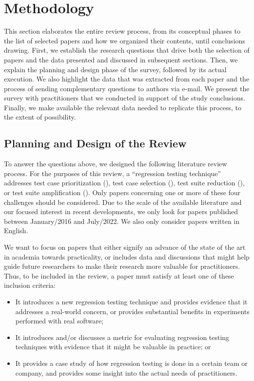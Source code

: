 \section{Methodology}\label{sec:lit_methodology}

This section elaborates the entire review process, from its conceptual phases to the list of selected papers and how we organized their contents, until conclusions drawing.
First, we establish the research questions that drive both the selection of papers and the data presented and discussed in subsequent sections.
Then, we explain the planning and design phase of the survey, followed by its actual execution.
We also highlight the data that was extracted from each paper and the process of sending complementary questions to authors via e-mail. We present the survey with practitioners that we conducted in support of the study conclusions.
Finally, we make available the relevant data needed to replicate this process, to the extent of possibility.

\subsection{Planning and Design of the Review}

To answer the questions above, we designed the following literature review process.
For the purposes of this review, a ``regression testing technique'' addresses test case prioritization (\tcp), test case selection (\tcs), test suite reduction (\tsr), or test suite amplification (\tsa).
Only papers concerning one or more of these four challenges should be considered.
Due to the scale of the available literature and our focused interest in recent developments, we only look for papers published between January/2016 and July/2022.
We also only consider papers written in English.

We want to focus on papers that either signify an advance of the state of the art in academia towards practicality, or includes data and discussions that might help guide future researchers to make their research more valuable for practitioners.
Thus, to be included in the review, a paper must satisfy at least one of these inclusion criteria:
\begin{itemize}
    \item It introduces a new regression testing technique and provides evidence that it addresses a real-world concern, or provides substantial benefits in experiments performed with real software;
    \item It introduces and/or discusses a metric for evaluating regression testing techniques with evidence that it might be valuable in practice; or
    \item It provides a case study of how regression testing is done in a certain team or company, and provides some insight into the actual needs of practitioners.
\end{itemize}

